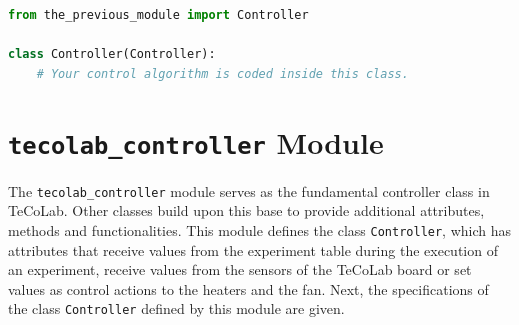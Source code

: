 \documentclass[12pt]{report}
\begin{document}
\begin{lstlisting}[language = Python]
from the_previous_module import Controller

class Controller(Controller):
	# Your control algorithm is coded inside this class.
\end{lstlisting}

\section{\texttt{tecolab\_controller} Module}

The \texttt{tecolab\_controller} module serves as the fundamental controller class in TeCoLab. Other classes build upon this base to provide additional attributes, methods and functionalities. This module defines the class \texttt{Controller}, which has attributes that receive values from the experiment table during the execution of an experiment, receive values from the sensors of the TeCoLab board or set values as control actions to the heaters and the fan. Next, the specifications of the class \texttt{Controller} defined by this module are given.
\end{document}
